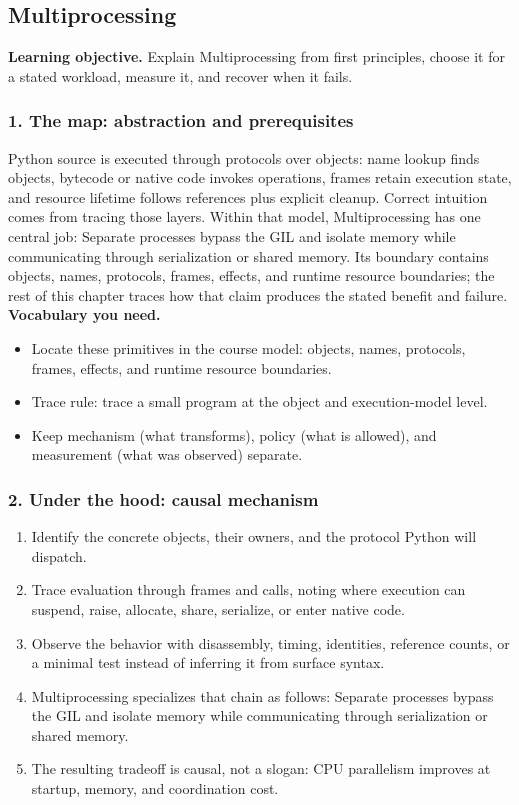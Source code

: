 \subsection{Multiprocessing}
\textbf{Learning objective.} Explain Multiprocessing from first principles, choose it for a stated workload, measure it, and recover when it fails.
\subsubsection*{1. The map: abstraction and prerequisites}
Python source is executed through protocols over objects: name lookup finds objects, bytecode or native code invokes operations, frames retain execution state, and resource lifetime follows references plus explicit cleanup. Correct intuition comes from tracing those layers.
Within that model, Multiprocessing has one central job: Separate processes bypass the GIL and isolate memory while communicating through serialization or shared memory. Its boundary contains objects, names, protocols, frames, effects, and runtime resource boundaries; the rest of this chapter traces how that claim produces the stated benefit and failure.
\textbf{Vocabulary you need.}\begin{itemize}
\item Locate these primitives in the course model: objects, names, protocols, frames, effects, and runtime resource boundaries.
\item Trace rule: trace a small program at the object and execution-model level.
\item Keep mechanism (what transforms), policy (what is allowed), and measurement (what was observed) separate.
\end{itemize}
\subsubsection*{2. Under the hood: causal mechanism}\begin{enumerate}
\item Identify the concrete objects, their owners, and the protocol Python will dispatch.
\item Trace evaluation through frames and calls, noting where execution can suspend, raise, allocate, share, serialize, or enter native code.
\item Observe the behavior with disassembly, timing, identities, reference counts, or a minimal test instead of inferring it from surface syntax.
\item Multiprocessing specializes that chain as follows: Separate processes bypass the GIL and isolate memory while communicating through serialization or shared memory.
\item The resulting tradeoff is causal, not a slogan: CPU parallelism improves at startup, memory, and coordination cost.
\end{enumerate}
